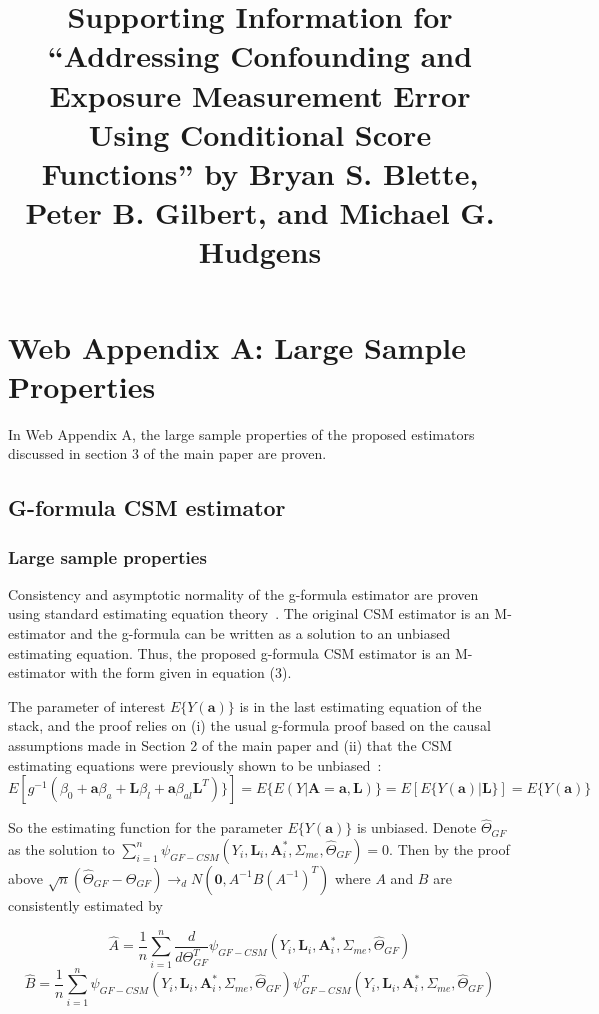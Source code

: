 \documentclass[12pt]{article}
\title{Supporting Information for ``Addressing Confounding and Exposure Measurement Error Using Conditional Score Functions'' by Bryan S. Blette, Peter B. Gilbert, and Michael G. Hudgens}
\date{}
\begin{document}


\maketitle

\section{Web Appendix A: Large Sample Properties}

In Web Appendix A, the large sample properties of the proposed estimators discussed in section 3 of the main paper are proven.

\subsection{G-formula CSM estimator}

\subsubsection{Large sample properties}

Consistency and asymptotic normality of the g-formula estimator are proven using standard estimating equation theory~\citep{stefanski2002}. The original CSM estimator is an M-estimator and the g-formula can be written as a solution to an unbiased estimating equation. Thus, the proposed g-formula CSM estimator is an M-estimator with the form given in equation (3).

The parameter of interest $E \{ Y(\bm{a}) \}$ is in the last estimating equation of the stack, and the proof relies on (i) the usual g-formula proof based on the causal assumptions made in Section 2 of the main paper and (ii) that the CSM estimating equations were previously shown to be unbiased~\citep{carroll2006}: $E[g^{-1}(\beta_{0} + \bm{a}\beta_{a} + \bm{L}\beta_{l} + \bm{a}\beta_{al}\bm{L}^{T}) \}] = E \{ E(Y | \bm{A} = \bm{a}, \bm{L}) \} = E[E \{ Y(\bm{a}) | \bm{L} \}] = E \{ Y(\bm{a}) \}$

So the estimating function for the parameter $E \{ Y(\bm{a}) \}$ is unbiased. Denote $\hat{\Theta}_{GF}$ as the solution to $\sum_{i=1}^{n} \psi_{GF-CSM}(Y_{i}, \bm{L}_{i}, \bm{A}^{*}_{i}, \Sigma_{me}, \hat{\Theta}_{GF}) = 0$. Then by the proof above $\sqrt{n}(\hat{\Theta}_{GF} - \Theta_{GF}) \rightarrow_{d} N(\textbf{0}, A^{-1}B(A^{-1})^{T})$ where $A$ and $B$ are consistently estimated by

\begin{equation*}
\hat{A} = \frac{1}{n} \sum_{i=1}^{n} \frac{d}{d\Theta_{GF}^{T}} \psi_{GF-CSM}(Y_{i}, \bm{L}_{i}, \bm{A}^{*}_{i}, \Sigma_{me}, \hat{\Theta}_{GF})
\end{equation*}
\begin{equation*}
\hat{B} = \frac{1}{n} \sum_{i=1}^{n} \psi_{GF-CSM}(Y_{i}, \bm{L}_{i}, \bm{A}^{*}_{i}, \Sigma_{me}, \hat{\Theta}_{GF}) \psi^{T}_{GF-CSM}(Y_{i}, \bm{L}_{i}, \bm{A}^{*}_{i}, \Sigma_{me}, \hat{\Theta}_{GF})
\end{equation*}
\end{document}
